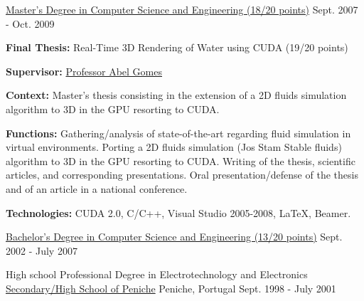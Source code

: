 \begin{cventries}
  \cventry
    {\href{https://www.ubi.pt/en/course/804}{Master's Degree in Computer Science and Engineering (18/20 points)}} %
    {} %
    {} %
    {Sept. 2007 - Oct. 2009} %
    {
      \begin{cvitems} %
        \item {\textbf{Final Thesis:} Real-Time 3D Rendering of Water using CUDA (19/20 points)}
        \item {\textbf{Supervisor:} \href{http://www.di.ubi.pt/~agomes/}{Professor Abel Gomes}}
		\item {\textbf{Context:} Master's thesis consisting in the extension of a 2D fluids simulation algorithm to 3D in the GPU resorting to CUDA. }
		\item {\textbf{Functions:} Gathering/analysis of state-of-the-art regarding fluid simulation in virtual environments. Porting a 2D fluids simulation (Jos Stam Stable fluids) algorithm to 3D in the GPU resorting to CUDA. Writing of the thesis, scientific articles, and corresponding presentations. Oral presentation/defense of the thesis and of an article in a national conference.}
        \item {\textbf{Technologies:} CUDA 2.0, C/C++, Visual Studio 2005-2008, LaTeX, Beamer.} %
      \end{cvitems}
    }

  \cventry
    {\href{https://www.ubi.pt/en/course/42}{Bachelor's Degree in Computer Science and Engineering (13/20 points)}} %
    {} %
    {} %
    {Sept. 2002 - July 2007} %
    {
    }

  \cventry
    {High school Professional Degree in Electrotechnology and Electronics} %
    {\href{http://espeniche.pt/sitesp/index.php}{Secondary/High School of Peniche}} %
    {Peniche, Portugal} %
    {Sept. 1998 - July 2001} %
    {
    }

\end{cventries}
